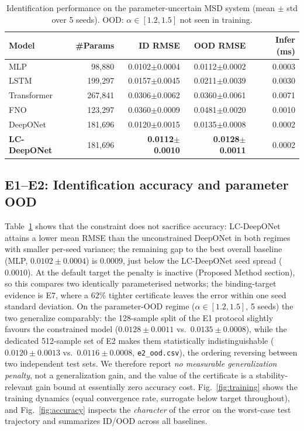 \documentclass[11pt,sagev,times]{sagej}
\begin{document}
\begin{table}[t]
\centering\small
\caption{Identification performance on the parameter-uncertain MSD system
(mean $\pm$ std over 5 seeds). OOD: $\alpha\in[1.2,1.5]$ not seen in training.}
\label{tab:e1}
\begin{tabular}{lrrrr}
\toprule
Model & \#Params & ID RMSE & OOD RMSE & Infer (ms) \\
\midrule
MLP          & 98{,}880  & 0.0102$\pm$0.0004 & 0.0112$\pm$0.0002 & 0.0003 \\
LSTM         & 199{,}297 & 0.0157$\pm$0.0045 & 0.0211$\pm$0.0039 & 0.0030 \\
Transformer  & 267{,}841 & 0.0306$\pm$0.0062 & 0.0360$\pm$0.0061 & 0.0071 \\
FNO          & 123{,}297 & 0.0360$\pm$0.0009 & 0.0481$\pm$0.0020 & 0.0010 \\
DeepONet     & 181{,}696 & 0.0120$\pm$0.0015 & 0.0135$\pm$0.0008 & 0.0002 \\
\textbf{LC-DeepONet} & 181{,}696 & \textbf{0.0112$\pm$0.0010} & \textbf{0.0128$\pm$0.0011} & 0.0002 \\
\bottomrule
\end{tabular}
\end{table}

\subsection{E1--E2: Identification accuracy and parameter OOD}
Table~\ref{tab:e1} shows that the constraint does not sacrifice accuracy:
LC-DeepONet attains a lower mean RMSE than the unconstrained DeepONet in both
regimes with smaller per-seed variance; the remaining gap to the best
overall baseline (MLP, $0.0102\pm0.0004$) is $0.0009$, just below the
LC-DeepONet seed spread ($0.0010$). At the
default target the penalty is inactive (Proposed Method section), so this
compares two identically parameterised networks; the binding-target evidence
is E7, where a $62\%$ tighter certificate leaves the error within one seed
standard deviation. On the parameter-OOD regime ($\alpha\in[1.2,1.5]$, 5 seeds) the two generalize
comparably: the 128-sample split of the E1 protocol slightly favours the
constrained model ($0.0128\pm0.0011$ vs.\ $0.0135\pm0.0008$), while the
dedicated 512-sample set of E2 makes them statistically indistinguishable
($0.0120\pm0.0013$ vs.\ $0.0116\pm0.0008$, \texttt{e2\_ood.csv}), the ordering
reversing between two independent test sets. We therefore report
\emph{no measurable generalization penalty}, not a generalization gain, and
the value of the certificate is a stability-relevant gain bound at essentially
zero accuracy cost. Fig.~\ref{fig:training} shows the training dynamics (equal
convergence rate, surrogate below target throughout), and
Fig.~\ref{fig:accuracy} inspects the \emph{character} of the error on the
worst-case test trajectory and summarizes ID/OOD across all baselines.
\end{document}
